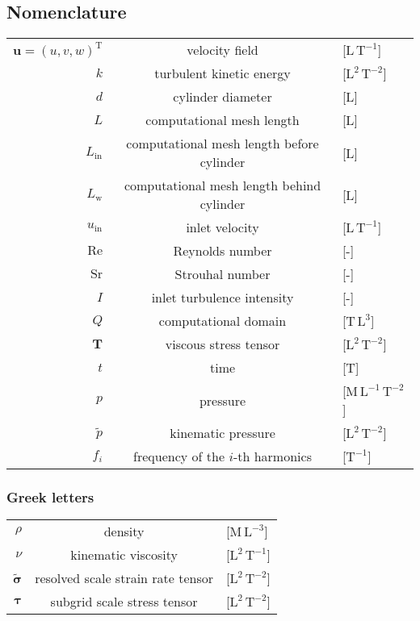 \subsection*{Nomenclature}
\label{sec:nomen}

\begin{tabular}{ rcl }
$\bm{u} = (u,v,w)^{\mathrm{T}}$ & velocity field & [$\mathrm{L\,T^{-1}}$] \\
$k$ & turbulent kinetic energy & [$\mathrm{L^2\,T^{-2}}$] \\
$d$ & cylinder diameter & [$\mathrm{L}$] \\
$L$ & computational mesh length & [$\mathrm{L}$] \\
$L_{\mathrm{in}}$ & computational mesh length before cylinder & [$\mathrm{L}$] \\
$L_{\mathrm{w}}$ & computational mesh length behind cylinder & [$\mathrm{L}$] \\
$u_{\mathrm{in}}$ & inlet velocity & [$\mathrm{L\,T^{-1}}$] \\
$\mathrm{Re}$ & Reynolds number & [-] \\
$\mathrm{Sr}$ & Strouhal number & [-] \\
$I$ & inlet turbulence intensity & [-] \\
$Q$ & computational domain & {[$\mathrm{T\, L^3}$]} \\
$\bm{T}$ & viscous stress tensor & [$\mathrm{L^{2}\,T^{-2}}$] \\
$t$ & time & [$\mathrm{T}$] \\
$p$ & pressure & [$\mathrm{M\,L^{-1}\,T^{-2}}$] \\
$\tilde{p}$ & kinematic pressure & [$\mathrm{L^{2}\,T^{-2}}$] \\
$f_i$ & frequency of the $i$-th harmonics & [{$\mathrm{T}^{-1}$}] \\
\end{tabular}

\subsubsection*{Greek letters}
\begin{tabular}{ rcl }
$\rho$ & density & [{$\mathrm{M\,L^{-3}}$}] \\
$\nu$ & kinematic viscosity & [{$\mathrm{L^2\,T^{-1}}$}] \\
$\bm{\tilde{\sigma}}$ & resolved scale strain rate tensor & [$\mathrm{L^{2}\,T^{-2}}$] \\
$\bm{{\tau}}$ & subgrid scale stress tensor & [$\mathrm{L^{2}\,T^{-2}}$] \\
\end{tabular}


